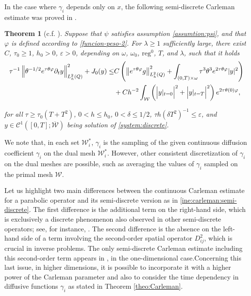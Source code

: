 \documentclass{amsart}
\numberwithin{equation}{section}
\newtheorem{theorem}{Theorem}[section]
\begin{document}
In the case where $\gamma_i$ depends only on $x$, the following semi-discrete Carleman estimate was proved in \cite{BLR-2014}.
\begin{theorem}[c.f. {\cite[Theorem 1.4]{BLR-2014}}] Suppose that $\psi$ satisfies assumption \eqref{assumtion:psi}, and that $\varphi$ is defined according to \eqref{funcion-peso-2}. For $\lambda\geq 1$ sufficiently large, there exist $C$, $\tau_{0}\geq 1$, $h_{0}>0$, $\varepsilon >0$, depending on $\omega$, $\omega_{0}$, $\mbox{reg}^{0}$, $T$, and $\lambda$, such that it holds
\begin{align}\label{ine:carleman:semi-discrete}
\tau^{-1}\left\|\theta^{-1/2}e^{\tau\theta\varphi}\partial_{t}y \right\|^{2}_{L^{2}_{h}(Q)}+J_0(y) \leq & C\left(\left\|e^{\tau\theta\varphi}g\right\|^{2}_{L^{2}_{h}(Q)}+\int_{(0,T)\times\omega}\tau^3\theta^3e^{2\tau\theta\varphi}|y|^2\right)\\
&+Ch^{-2}\int_{\mathcal{W}} \left(\Big|y|_{t=0}\Big|^2+\Big|y|_{t=T}\Big|^2\right)e^{2\tau\theta(0)\varphi},\notag
\end{align}

for all $\tau\geq \tau_{0}(T+T^{2})$, $0<h\leq h_{0}$, $0<\delta \leq 1/2$, $\tau h(\delta T^{2})^{-1}\leq \varepsilon$, and $y\in \mathcal{C}^{1}([0,T];\overline{\mathcal{W}})$ being  solution of \eqref{system:discrete}.
\end{theorem}

We note that, in each set $\mathcal{W}^\ast_i$, $\gamma_i$ is the sampling of the given continuous diffusion coefficient $\gamma_i$ on the dual mesh $\mathcal{W}^\ast_i$. However, other consistent discretization of $\gamma_i$ on the dual meshes are possible, such as averaging the values of $\gamma_i$ sampled on the primal mesh  $\mathcal{W}$.

Let us highlight two main differences between the continuous Carleman estimate for a parabolic operator and its semi-discrete version as in \eqref{ine:carleman:semi-discrete}. The first difference is the additional term on the right-hand side, which is exclusively a discrete phenomenon also observed in other semi-discrete operators; see, for instance, \cite{BEO-2015,ZZ-2022,ZZ-2023}. The second difference is the absence on the left-hand side of a term involving the second-order spatial operator $D^{2}_{ij}$, which is crucial in inverse problems. The only semi-discrete Carleman estimate including this second-order term appears in \cite{BHSDT:2019}, in the one-dimensional case.Concerning this last issue, in higher dimensions, it is possible to incorporate it with a higher power of the Carleman parameter and also to consider the time dependency in diffusive functions $\gamma_i$ as stated in Theorem \ref{theo:Carleman}. 
\end{document}
